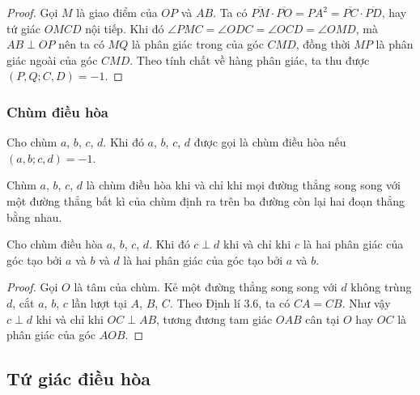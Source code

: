 \documentclass{article} %
\begin{document}
        \begin{proof}
            Gọi \(M\) là giao điểm của \(OP\) và \(AB\). Ta có \(\overline{PM} \cdot \overline{PO} = PA^2 = \overline{PC} \cdot \overline{PD}\), hay tứ giác \(OMCD\) nội tiếp. Khi đó \(\angle PMC = \angle ODC = \angle OCD = \angle OMD\), mà \(AB \perp OP\) nên ta có \(MQ\) là phân giác trong của góc \(CMD\), đồng thời \(MP\) là phân giác ngoài của góc \(CMD\). Theo tính chất về hàng phân giác, ta thu được \((P,Q;C,D) = -1\).
        \end{proof}

        \subsubsection*{Chùm điều hòa}

        \begin{definition}
            Cho chùm \(a\), \(b\), \(c\), \(d\). Khi đó \(a\), \(b\), \(c\), \(d\) được gọi là chùm điều hòa nếu \((a,b;c,d) = -1\).
        \end{definition}

        \begin{theorem}
            Chùm \(a\), \(b\), \(c\), \(d\) là chùm điều hòa khi và chỉ khi mọi đường thẳng song song với một đường thẳng bất kì của chùm định ra trên ba đường còn lại hai đoạn thẳng bằng nhau. 
        \end{theorem}

        \begin{theorem}
            Cho chùm điều hòa \(a\), \(b\), \(c\), \(d\). Khi đó \(c \perp d\) khi và chỉ khi \(c\) là hai phân giác của góc tạo bởi \(a\) và \(b\) và \(d\) là hai phân giác của góc tạo bởi \(a\) và \(b\).
        \end{theorem}

        \begin{proof}
            Gọi \(O\) là tâm của chùm. Kẻ một đường thẳng song song với \(d\) không trùng \(d\), cắt \(a\), \(b\), \(c\) lần lượt tại \(A\), \(B\), \(C\). Theo Định lí 3.6, ta có \(CA = CB\). Như vậy \(c \perp d\) khi và chỉ khi \(OC \perp AB\), tương đương tam giác \(OAB\) cân tại \(O\) hay \(OC\) là phân giác của góc \(AOB\).
        \end{proof}

    \subsection{Tứ giác điều hòa}
\end{document}
